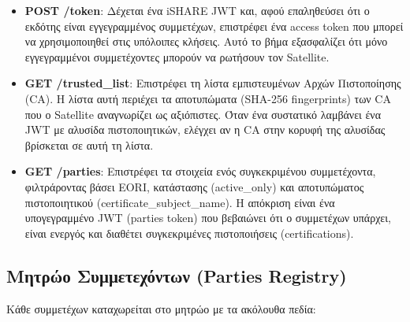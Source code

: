 \begin{itemize}
    \item \textbf{\textlatin{POST /token}}: Δέχεται ένα \textlatin{iSHARE
    JWT} και, αφού επαληθεύσει ότι ο εκδότης είναι εγγεγραμμένος
    συμμετέχων, επιστρέφει ένα \textlatin{access token} που μπορεί
    να χρησιμοποιηθεί στις υπόλοιπες κλήσεις. Αυτό το βήμα εξασφαλίζει
    ότι μόνο εγγεγραμμένοι συμμετέχοντες μπορούν να ρωτήσουν τον
    \textlatin{Satellite}.

    \item \textbf{\textlatin{GET /trusted\_list}}: Επιστρέφει τη λίστα
    εμπιστευμένων Αρχών Πιστοποίησης (\textlatin{CA}). Η λίστα αυτή
    περιέχει τα αποτυπώματα (\textlatin{SHA-256 fingerprints}) των
    \textlatin{CA} που ο \textlatin{Satellite} αναγνωρίζει ως
    αξιόπιστες. Όταν ένα συστατικό λαμβάνει
    ένα \textlatin{JWT} με αλυσίδα πιστοποιητικών, ελέγχει αν η
    \textlatin{CA} στην κορυφή της αλυσίδας βρίσκεται σε αυτή
    τη λίστα.

    \item \textbf{\textlatin{GET /parties}}: Επιστρέφει τα στοιχεία
    ενός συγκεκριμένου συμμετέχοντα, φιλτράροντας βάσει \textlatin{EORI},
    κατάστασης (\textlatin{active\_only}) και αποτυπώματος
    πιστοποιητικού (\textlatin{certificate\_subject\_name}). Η
    απόκριση είναι ένα υπογεγραμμένο \textlatin{JWT}
    (\textlatin{parties token}) που βεβαιώνει ότι ο συμμετέχων
    υπάρχει, είναι ενεργός και διαθέτει συγκεκριμένες πιστοποιήσεις
    (\textlatin{certifications}).
\end{itemize}

\subsection{Μητρώο Συμμετεχόντων (\textlatin{Parties Registry})}
\label{subsec:parties-registry}

Κάθε συμμετέχων καταχωρείται στο μητρώο με τα ακόλουθα πεδία:

